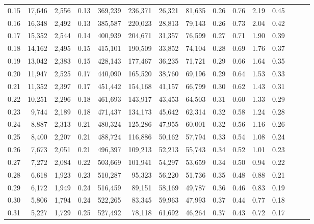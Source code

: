 \begin{tabular}{rrrrrrrrrrrrrrr}
0.15 &  17,646 &  2,556 &  0.13 &  369,239 &  236,371 &   26,321 &   81,635 &  0.26 &  0.76 &  2.19 &      0.45 \\
0.16 &  16,348 &  2,492 &  0.13 &  385,587 &  220,023 &   28,813 &   79,143 &  0.26 &  0.73 &  2.04 &      0.42 \\
0.17 &  15,352 &  2,544 &  0.14 &  400,939 &  204,671 &   31,357 &   76,599 &  0.27 &  0.71 &  1.90 &      0.39 \\
0.18 &  14,162 &  2,495 &  0.15 &  415,101 &  190,509 &   33,852 &   74,104 &  0.28 &  0.69 &  1.76 &      0.37 \\
0.19 &  13,042 &  2,383 &  0.15 &  428,143 &  177,467 &   36,235 &   71,721 &  0.29 &  0.66 &  1.64 &      0.35 \\
0.20 &  11,947 &  2,525 &  0.17 &  440,090 &  165,520 &   38,760 &   69,196 &  0.29 &  0.64 &  1.53 &      0.33 \\
0.21 &  11,352 &  2,397 &  0.17 &  451,442 &  154,168 &   41,157 &   66,799 &  0.30 &  0.62 &  1.43 &      0.31 \\
0.22 &  10,251 &  2,296 &  0.18 &  461,693 &  143,917 &   43,453 &   64,503 &  0.31 &  0.60 &  1.33 &      0.29 \\
0.23 &   9,744 &  2,189 &  0.18 &  471,437 &  134,173 &   45,642 &   62,314 &  0.32 &  0.58 &  1.24 &      0.28 \\
0.24 &   8,887 &  2,313 &  0.21 &  480,324 &  125,286 &   47,955 &   60,001 &  0.32 &  0.56 &  1.16 &      0.26 \\
0.25 &   8,400 &  2,207 &  0.21 &  488,724 &  116,886 &   50,162 &   57,794 &  0.33 &  0.54 &  1.08 &      0.24 \\
0.26 &   7,673 &  2,051 &  0.21 &  496,397 &  109,213 &   52,213 &   55,743 &  0.34 &  0.52 &  1.01 &      0.23 \\
0.27 &   7,272 &  2,084 &  0.22 &  503,669 &  101,941 &   54,297 &   53,659 &  0.34 &  0.50 &  0.94 &      0.22 \\
0.28 &   6,618 &  1,923 &  0.23 &  510,287 &   95,323 &   56,220 &   51,736 &  0.35 &  0.48 &  0.88 &      0.21 \\
0.29 &   6,172 &  1,949 &  0.24 &  516,459 &   89,151 &   58,169 &   49,787 &  0.36 &  0.46 &  0.83 &      0.19 \\
0.30 &   5,806 &  1,794 &  0.24 &  522,265 &   83,345 &   59,963 &   47,993 &  0.37 &  0.44 &  0.77 &      0.18 \\
0.31 &   5,227 &  1,729 &  0.25 &  527,492 &   78,118 &   61,692 &   46,264 &  0.37 &  0.43 &  0.72 &      0.17 \\

\end{tabular}
